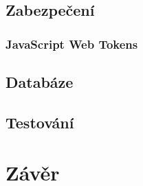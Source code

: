 \documentclass[a4paper,11pt,titlepage,fleqn]{article}
\begin{document}
    \subsection{Zabezpečení}

        \subsubsection{JavaScript Web Tokens}
            \label{jwt}

    \subsection{Databáze}
        \label{db}

    \subsection{Testování}

\newpage
\section{Závěr}
\end{document}
